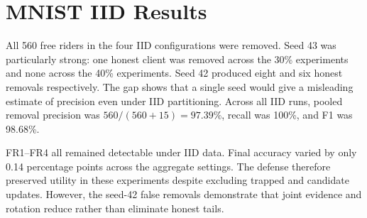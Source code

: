 \begin{table}[htbp]
\centering
\caption{Aggregate v8 results across FR1--FR4 for each setting}
\label{tab:aggregate-results}
\end{table}

\section{MNIST IID Results}

All 560 free riders in the four IID configurations were removed. Seed 43 was particularly strong: one honest client was removed across the 30\% experiments and none across the 40\% experiments. Seed 42 produced eight and six honest removals respectively. The gap shows that a single seed would give a misleading estimate of precision even under IID partitioning. Across all IID runs, pooled removal precision was $560/(560+15)=97.39\%$, recall was 100\%, and F1 was 98.68\%.

FR1--FR4 all remained detectable under IID data. Final accuracy varied by only 0.14 percentage points across the aggregate settings. The defense therefore preserved utility in these experiments despite excluding trapped and candidate updates. However, the seed-42 false removals demonstrate that joint evidence and rotation reduce rather than eliminate honest tails.


